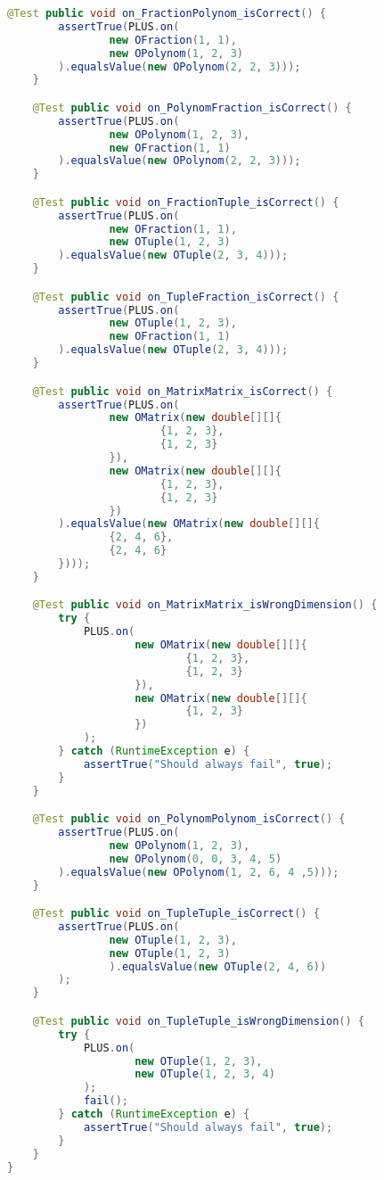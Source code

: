 \begin{lstlisting}[caption=PlusTest (Schwenke),label=list:PlusTest,language=Java]
    @Test public void on_FractionPolynom_isCorrect() {
        assertTrue(PLUS.on(
                new OFraction(1, 1),
                new OPolynom(1, 2, 3)
        ).equalsValue(new OPolynom(2, 2, 3)));
    }

    @Test public void on_PolynomFraction_isCorrect() {
        assertTrue(PLUS.on(
                new OPolynom(1, 2, 3),
                new OFraction(1, 1)
        ).equalsValue(new OPolynom(2, 2, 3)));
    }

    @Test public void on_FractionTuple_isCorrect() {
        assertTrue(PLUS.on(
                new OFraction(1, 1),
                new OTuple(1, 2, 3)
        ).equalsValue(new OTuple(2, 3, 4)));
    }

    @Test public void on_TupleFraction_isCorrect() {
        assertTrue(PLUS.on(
                new OTuple(1, 2, 3),
                new OFraction(1, 1)
        ).equalsValue(new OTuple(2, 3, 4)));
    }

    @Test public void on_MatrixMatrix_isCorrect() {
        assertTrue(PLUS.on(
                new OMatrix(new double[][]{
                        {1, 2, 3},
                        {1, 2, 3}
                }),
                new OMatrix(new double[][]{
                        {1, 2, 3},
                        {1, 2, 3}
                })
        ).equalsValue(new OMatrix(new double[][]{
                {2, 4, 6},
                {2, 4, 6}
        })));
    }

    @Test public void on_MatrixMatrix_isWrongDimension() {
        try {
            PLUS.on(
                    new OMatrix(new double[][]{
                            {1, 2, 3},
                            {1, 2, 3}
                    }),
                    new OMatrix(new double[][]{
                            {1, 2, 3}
                    })
            );
        } catch (RuntimeException e) {
            assertTrue("Should always fail", true);
        }
    }

    @Test public void on_PolynomPolynom_isCorrect() {
        assertTrue(PLUS.on(
                new OPolynom(1, 2, 3),
                new OPolynom(0, 0, 3, 4, 5)
        ).equalsValue(new OPolynom(1, 2, 6, 4 ,5)));
    }

    @Test public void on_TupleTuple_isCorrect() {
        assertTrue(PLUS.on(
                new OTuple(1, 2, 3),
                new OTuple(1, 2, 3)
                ).equalsValue(new OTuple(2, 4, 6))
        );
    }

    @Test public void on_TupleTuple_isWrongDimension() {
        try {
            PLUS.on(
                    new OTuple(1, 2, 3),
                    new OTuple(1, 2, 3, 4)
            );
            fail();
        } catch (RuntimeException e) {
            assertTrue("Should always fail", true);
        }
    }
}
\end{lstlisting}

